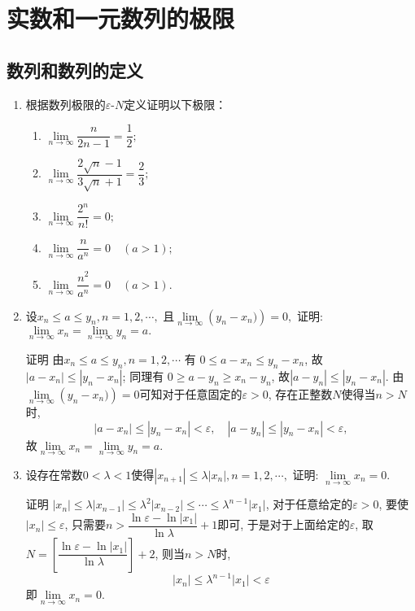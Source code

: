 \documentclass[UTF8,a4paper,20pt]{article}
\begin{document}
\newcommand{\e}{\mathrm{e}}
\newcommand{\ud}[1]{\mathrm{d}#1}
\renewcommand{\emptyset}{\varnothing}
\pagestyle{empty}
\tableofcontents
\clearpage
\pagestyle{plain}

\section{实数和一元数列的极限}\setcounter{page}{1}
\subsection{数列和数列的定义}
\begin{enumerate}
\item {\large\kaishu 根据数列极限的$\varepsilon$-$N$定义证明以下极限：}
	\begin{enumerate}[(1)]
	\item $\lim\limits_{n \to \infty}\dfrac{n}{2n-1}=\dfrac{1}{2};$
	\item $\lim\limits_{n \to \infty}\dfrac{2\sqrt{n}-1}{3\sqrt{n}+1}=\dfrac{2}{3};$
	\item $\lim\limits_{n \to \infty}\dfrac{2^n}{n!}=0;$
	\item $\lim\limits_{n \to \infty}\dfrac{n}{a^n}=0\quad(a>1);$
	\item $\lim\limits_{n \to \infty}\dfrac{n^2}{a^n}=0\quad(a>1).$
	\end{enumerate}

\item {\large\kaishu 设$x_n\leqslant a\leqslant y_n, n=1,2,\cdots,$ 且$\lim\limits_{n \to \infty}\left(y_n-x_n)\right)=0,$ 证明: $\lim\limits_{n\to \infty} x_n=\lim\limits_{n\to \infty} y_n = a.$}

{\heiti 证明} 由$x_n\leqslant a\leqslant y_n, n=1,2,\cdots$ 有 $0\leqslant a-x_n\leqslant y_n-x_n$, 故$|a-x_n|\leqslant |y_n-x_n|$; 同理有 $0 \geqslant a-y_n \geqslant x_n-y_n$, 故$|a-y_n|\leqslant|y_n-x_n|$. 由$\lim\limits_{n \to \infty}\left(y_n-x_n)\right)=0$可知对于任意固定的$\varepsilon>0$, 存在正整数$N$使得当$n>N$时,
\[
	|a-x_n|\leqslant|y_n-x_n|<\varepsilon,\quad
	|a-y_n|\leqslant|y_n-x_n|<\varepsilon,
\]
故$\lim\limits_{n \to \infty}x_n=\lim\limits_{n \to \infty}y_n=a.$

\item {\large\kaishu 设存在常数$0<\lambda<1$使得$|x_{n+1}|\leqslant\lambda|x_n|, n=1,2,\cdots,$ 证明: $\lim\limits_{n\to \infty}x_n=0.$}

{\heiti 证明} $|x_n|\leqslant\lambda|x_{n-1}|\leqslant\lambda^2|x_{n-2}|\leqslant\cdots\leqslant\lambda^{n-1}|x_1|$, 对于任意给定的$\varepsilon >0$, 要使$|x_n|\leqslant\varepsilon$, 只需要$n>\dfrac{\ln \varepsilon-\ln|x_1|}{\ln \lambda}+1$即可, 于是对于上面给定的$\varepsilon$, 取$N=\left[\dfrac{\ln \varepsilon-\ln|x_1|}{\ln \lambda}\right]+2$, 则当$n>N$时,
\[
	|x_n|\leqslant\lambda^{n-1}|x_1|<\varepsilon
\]
即$\lim\limits_{n\to \infty}x_n=0.$


\end{enumerate}
\end{document}
